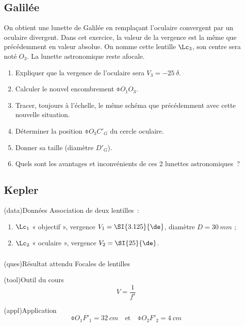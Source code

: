 \documentclass[../../main/main.tex]{subfiles}
\begin{document}
{	\subsection{Galilée}

	On obtient une lunette de Galilée en remplaçant l'oculaire convergent par un
	oculaire divergent. Dans cet exercice, la valeur de la vergence est la même que
	précédemment en valeur absolue. On nomme cette lentille $\Lc_3$, son centre sera
	noté $O_3$. La lunette astronomique reste afocale.

	\begin{enumerate}
		\item Expliquer que la vergence de l'oculaire sera $V_3 = \SI{-25}{\delta}$.
		\item Calculer le nouvel encombrement $\obar{O_1O_3}$.
		\item Tracer, toujours à l'échelle, le même schéma que précédemment avec
		      cette nouvelle situation.
		\item Déterminer la position $\obar{O_3C'_G}$ du cercle oculaire.
		\item Donner sa taille (diamètre $D'_G$).
		\item Quels sont les avantages et inconvénients de ces 2 lunettes
		      astronomiques~?
	\end{enumerate}
}{
	\subsection{Kepler}

	\begin{center}
		\begin{tcb}[width=.8\linewidth](data){Données}
			Association de deux lentilles~:
			\begin{enumerate}
				\item $\Lc_1$ « objectif », vergence $V_1 = \SI{3.125}{\de}$, diamètre $D
					      = \SI{30}{mm}$ ;
				\item $\Lc_2$ « oculaire », vergence $V_2 = \SI{25}{\de}$.
			\end{enumerate}
		\end{tcb}
	\end{center}

	\subsubsection{}

	\begin{tcbraster}[raster columns=7, raster equal height=rows]
		\begin{tcb}[raster multicolumn=2](ques){Résultat attendu}
			Focales de lentilles
		\end{tcb}
		\begin{tcb}[raster multicolumn=2](tool){Outil du cours}
			$$V = \dfrac{1}{f'}$$
		\end{tcb}
		\begin{tcb}[raster multicolumn=3, valign=top](appl){Application}
			\[ \boxed{\obar{O_1F'_1} = \SI{32}{cm}} \quad\text{et}\quad
				\boxed{\obar{O_2F'_2} = \SI{4}{cm}} \]
		\end{tcb}
	\end{tcbraster}

}
\end{document}
